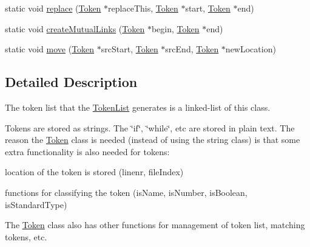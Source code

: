 \begin{DoxyCompactItemize}
\item 
static void \hyperlink{class_token_a3c6eec9d87b323d937b06724e74be76c}{replace} (\hyperlink{class_token}{Token} $\ast$replace\-This, \hyperlink{class_token}{Token} $\ast$start, \hyperlink{class_token}{Token} $\ast$end)
\item 
static void \hyperlink{class_token_a63497f942fdbcc45100f07e94626cddf}{create\-Mutual\-Links} (\hyperlink{class_token}{Token} $\ast$begin, \hyperlink{class_token}{Token} $\ast$end)
\item 
static void \hyperlink{class_token_a969fe5b670d233692b05d03f8d8237c1}{move} (\hyperlink{class_token}{Token} $\ast$src\-Start, \hyperlink{class_token}{Token} $\ast$src\-End, \hyperlink{class_token}{Token} $\ast$new\-Location)
\end{DoxyCompactItemize}


\subsection{Detailed Description}
The token list that the \hyperlink{class_token_list}{Token\-List} generates is a linked-\/list of this class. 

Tokens are stored as strings. The \char`\"{}if\char`\"{}, \char`\"{}while\char`\"{}, etc are stored in plain text. The reason the \hyperlink{class_token}{Token} class is needed (instead of using the string class) is that some extra functionality is also needed for tokens\-:
\begin{DoxyItemize}
\item location of the token is stored (linenr, file\-Index)
\item functions for classifying the token (is\-Name, is\-Number, is\-Boolean, is\-Standard\-Type)
\end{DoxyItemize}

The \hyperlink{class_token}{Token} class also has other functions for management of token list, matching tokens, etc. 

